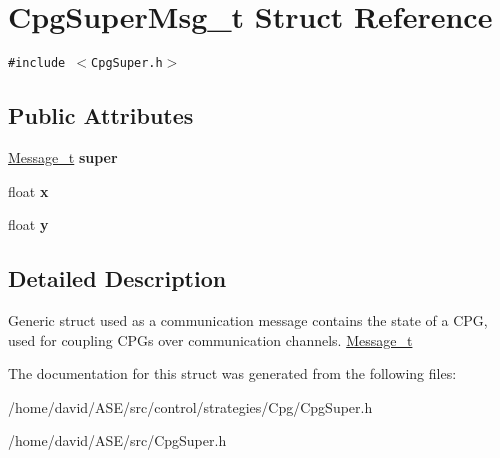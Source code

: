 \hypertarget{structCpgSuperMsg__t}{
\section{CpgSuperMsg\_\-t Struct Reference}
\label{structCpgSuperMsg__t}
}
{\tt \#include $<$CpgSuper.h$>$}

\subsection*{Public Attributes}
\begin{CompactItemize}
\item 
\hypertarget{structCpgSuperMsg__t_bc825bfe9cb56b73a7b83f84403d893a}{
\hyperlink{structMessage__t}{Message\_\-t} \textbf{super}}
\label{structCpgSuperMsg__t_bc825bfe9cb56b73a7b83f84403d893a}

\item 
\hypertarget{structCpgSuperMsg__t_35085a7c4ddb0928ac556a2dcb79a2ec}{
float \textbf{x}}
\label{structCpgSuperMsg__t_35085a7c4ddb0928ac556a2dcb79a2ec}

\item 
\hypertarget{structCpgSuperMsg__t_7e79b693815768cfef98bf449763d83b}{
float \textbf{y}}
\label{structCpgSuperMsg__t_7e79b693815768cfef98bf449763d83b}

\end{CompactItemize}


\subsection{Detailed Description}
Generic struct used as a communication message contains the state of a CPG, used for coupling CPGs over communication channels.  \hyperlink{structMessage__t}{Message\_\-t} 

The documentation for this struct was generated from the following files:\begin{CompactItemize}
\item 
/home/david/ASE/src/control/strategies/Cpg/CpgSuper.h\item 
/home/david/ASE/src/CpgSuper.h\end{CompactItemize}
